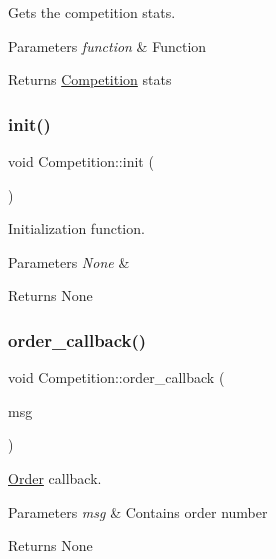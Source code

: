 Gets the competition stats. 


\begin{DoxyParams}{Parameters}
{\em function} & Function \\
\hline
\end{DoxyParams}
\begin{DoxyReturn}{Returns}
\hyperlink{classCompetition}{Competition} stats 
\end{DoxyReturn}
\mbox{\label{classCompetition_af5400538e024248fc99f83cf26ca2f23}} 
\subsubsection{\texorpdfstring{init()}{init()}}
{\footnotesize\ttfamily void Competition\+::init (\begin{DoxyParamCaption}{ }\end{DoxyParamCaption})}



Initialization function. 


\begin{DoxyParams}{Parameters}
{\em None} & \\
\hline
\end{DoxyParams}
\begin{DoxyReturn}{Returns}
None 
\end{DoxyReturn}
\mbox{\label{classCompetition_a6f51ab2e5a0da50fc53035f3ff6c9c31}} 
\subsubsection{\texorpdfstring{order\+\_\+callback()}{order\_callback()}}
{\footnotesize\ttfamily void Competition\+::order\+\_\+callback (\begin{DoxyParamCaption}\item[{const nist\+\_\+gear\+::\+Order\+::\+Const\+Ptr \&}]{msg }\end{DoxyParamCaption})}



\hyperlink{structOrder}{Order} callback. 


\begin{DoxyParams}{Parameters}
{\em msg} & Contains order number \\
\hline
\end{DoxyParams}
\begin{DoxyReturn}{Returns}
None 
\end{DoxyReturn}
\mbox{\label{classCompetition_a0f5358904edd5675f14fc378b217f3f9}} 
